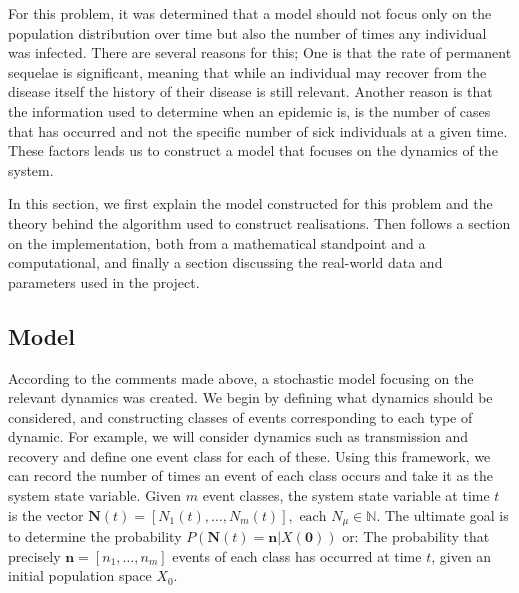 \documentclass[10pt,a4paper]{article}
\begin{document}
For this problem, it was determined that a model should not focus only on the population distribution over time but also the number of times any individual was infected. There are several reasons for this; One is that the rate of permanent sequelae is significant, meaning that while an individual may recover from the disease itself the history of their disease is still relevant. Another reason is that the information used to determine when an epidemic is, is the number of cases that has occurred and not the specific number of sick individuals at a given time. These factors leads us to construct a model that focuses on the dynamics of the system.

In this section, we first explain the model constructed for this problem and the theory behind the algorithm used to construct realisations. Then follows a section on the implementation, both from a mathematical standpoint and a computational, and finally a section discussing the real-world data and parameters used in the project.

%
%


\subsection{Model}

According to the comments made above, a stochastic model focusing on the relevant dynamics was created. We begin by defining what dynamics should be considered, and constructing classes of events corresponding to each type of dynamic. For example, we will consider dynamics such as transmission and recovery and define one event class for each of these. Using this framework, we can record the number of times an event of each class occurs and take it as the system state variable. Given $m$ event classes, the system state variable at time $t$ is the vector $\bm{N}\left( t \right) = \left[ N_1 \left( t \right), \ldots, N_m \left( t \right) \right], \textrm{ each }N_\mu \in \mathbb{N}$. The ultimate goal is to determine the probability $P \left( \bm{N}\left( t \right)  = \bm{n} | X\left( \bm{0} \right) \right)$ or: The probability that precisely $\bm{n} = \left[ n_1, \ldots, n_m \right]$ events of each class has occurred at time $t$, given an initial population space $X_0$.
\end{document}
